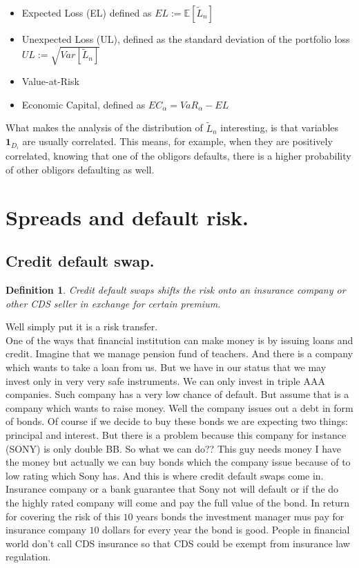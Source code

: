\documentclass{book}
\newtheorem{definition}{Definition}[section]
\begin{document}
\begin{itemize}
\item Expected Loss (EL) defined as $EL:=\mathbb{E}[\tilde{L}_{n}]$
\item Unexpected Loss (UL), defined as the standard deviation of the portfolio loss $UL:=\sqrt{Var[\tilde{L}_{n}]}$
\item Value-at-Risk
\item Economic Capital, defined as $EC_{\alpha}=VaR_{\alpha}-EL$
\end{itemize}
What makes the analysis of the distribution of $\tilde{L}_{n}$ interesting, is that variables $\mathbf{1}_{D_{i}}$ are usually correlated. This means, for example, when they are positively correlated, knowing that one of the obligors defaults, there is a higher probability of other obligors defaulting as well.\\
\section{Spreads and default risk.}
\subsection{Credit default swap.}
\begin{definition}
Credit default swaps shifts the risk onto an insurance company or other CDS seller in exchange for certain premium.
\end{definition}
Well simply put it is a risk transfer.\\
One of the ways that financial institution can make money is by issuing loans and credit. Imagine that we manage pension fund of teachers. And there is a company which wants to take a loan from us. But we have in our status that we may invest only in very very safe instruments. We can only invest in triple AAA companies. Such company has a very low chance of default. But assume that is a company which wants to raise money. Well the company issues out a debt in form of bonds. Of course if we decide to buy these bonds we are expecting two things: principal and interest. But there is a problem because this company for instance (SONY) is only double BB. So what we can do?? This guy needs money I have the money but actually we can buy bonds which the company issue because of to low rating which Sony has. And this is where credit default swaps come in. Insurance company or a bank guarantee that Sony not will default or if the do the highly rated company will come and pay the full value of the bond. In return for covering the risk of this $10$ years bonds the investment manager mus pay for insurance company $10$ dollars for every year the bond is good. People in financial world don't call CDS insurance so that CDS could be exempt from insurance law regulation.
\end{document}
